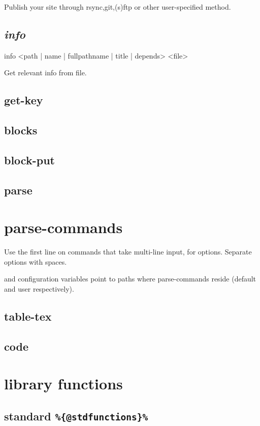 \documentclass{memoir}
\newcommand{\var}[1]{\texttt{\%\{#1\}\%}}
\begin{document}
	Publish your site through rsync,git,(s)ftp or other user-specified method.
	\section{\emph{info}}
	info <path | name | fullpathname | title | depends> <file>

	Get relevant info from file.
	\section{get-key}
	\section{blocks}
	\section{block-put}
	\section{parse}


\chapter{parse-commands} %
	Use the first line on commands that take multi-line input, for options.
	Separate options with spaces.

	and  configuration variables point to paths where 
	parse-commands reside (default and user respectively).

	\section{table-tex}
	\section{code}


\chapter{library functions} %

	\section{standard \var{@stdfunctions}} %
\end{document}
